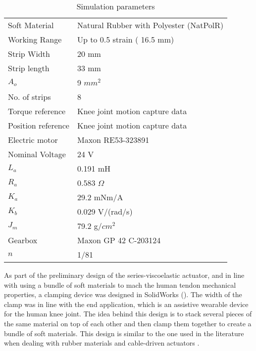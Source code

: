 \begin{table}[hbt!]
    \centering
    \caption{Simulation parameters}
    \begin{tabular}{ll}
    \toprule
    Soft Material       & Natural Rubber with Polyester (NatPolR)\\
    Working Range       & Up to 0.5 strain ( 16.5 mm)\\
    Strip Width        & 20 mm\\
    Strip length       & 33 mm\\
    $A_o$               & 9 $mm^2$\\
    No. of strips      & 8\\ 
    Torque reference    & Knee joint motion capture data \\
    Position reference  & Knee joint motion capture data \\
    \midrule
    Electric motor      & Maxon RE53-323891 \cite{Maxon2019motor}\\
    Nominal Voltage     & 24 V\\
    $L_a$               & 0.191 mH\\
    $R_a$               & 0.583 $\Omega$\\
    $K_a$               & 29.2 mNm/A\\
    $K_b$               & 0.029 V/(rad/s)\\
    $J_m$               & 79.2 g/$cm^2$\\
    \midrule
    Gearbox             & Maxon GP 42 C-203124 \cite{Maxon2019gearhead}\\
    $n$                 & 1/81\\
    \end{tabular}
    \label{tbl:simParameters}
\end{table}

As part of the preliminary design of the series-viscoelastic actuator, and in line with using a bundle of soft materials to mach the human tendon mechanical properties, a clamping device was designed in SolidWorks\textregistered{} (). The width of the clamp was in line with the end application, which is an assistive wearable device for the human knee joint. The idea behind this design is to stack several pieces of the same material on top of each other and then clamp them together to create a bundle of soft materials. This design is similar to the one used in the literature when dealing with rubber materials and cable-driven actuators \cite{austin2015control}.

